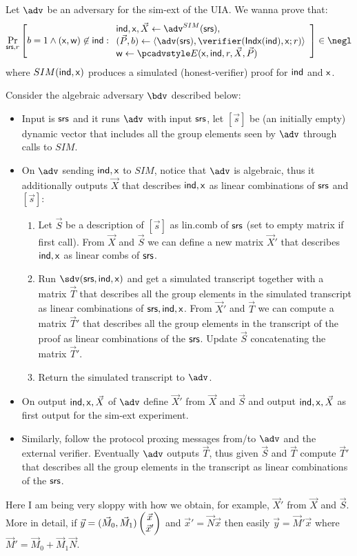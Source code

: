\documentclass[runningheads,11pt]{llncs}
\let\spvec\vec \let\vec\accentvec
\let\vec\spvec
\begin{document}
Let $\adv$ be an adversary for the sim-ext of the UIA.
We wanna prove that:
\[
			\Prob[\srs,r]{
					b=1 \wedge (\inp,\wit)\not\in\ind:
					\begin{array}{l}
						\ind,\inp, \vec X \gets\adv^{SIM}(\srs),\\
					(\vec P,b) \gets \braket{\adv(\srs),\verifier(\Iphp(\ind),\inp;r)}\\
					\wit \gets \Ext(\inp,\ind,r,\vec X,\vec P)
					\end{array}
					}\in\negl
\]
where $SIM( {\mathsf{ind}},\mathsf{x} )$ produces a simulated (honest-verifier) proof for ${\mathsf{ind}}$ and $\mathsf{x}$.

Consider the algebraic adversary $\bdv$ described below:
\begin{itemize}
	\item Input is $\mathsf{srs}$ and it runs $\adv$ with input $\mathsf{srs}$, let $[\vec s]$ be (an
		initially empty)	dynamic vector that includes all the group elements seen by $\adv$ through calls to
		$SIM$.
	\item On $\adv$ sending ${\mathsf{ind}},\mathsf{x}$ to $SIM$, notice that $\adv$ is algebraic, thus it
		additionally outputs $\vec X$ that describes ${\mathsf{ind}},\mathsf{x}$ as linear combinations of
		$\mathsf{srs}$ and $[\vec s]$:
		\begin{enumerate}
			\item Let $\vec S$ be a description of $[\vec s]$ as lin.comb of $\mathsf{srs}$ (set to empty
				matrix if first call).
				From $\vec X$ and $\vec S$ we can define a new matrix $\vec X'$ that describes
				${\mathsf{ind}},\mathsf{x}$ as linear combs of $\mathsf{srs}$.
			\item Run $\sdv(\srs,\ind,\inp)$ and get a simulated transcript together with a matrix $\vec T$
				 that describes all the group elements in the simulated transcript as linear combinations of $\mathsf{srs},{\mathsf{ind}},\mathsf{x}$.
					From $\vec X'$ and $\vec T$ we can compute a matrix $\vec T'$ that describes all
					the group elements in the transcript of the proof as linear combinations of the
					$\mathsf{srs}$. Update $\vec S$ concatenating the matrix $\vec T'$.
			\item Return the simulated transcript to $\adv$.
		\end{enumerate}
	\item On output $\ind,\inp,\vec X$ of $\adv$ define $\vec X'$ from $\vec X$ and $\vec S$
		and output $\ind,\inp,\vec X$ as first output for the sim-ext experiment.
	\item Similarly, follow the protocol proxing messages from/to $\adv$ and the external verifier.
		Eventually $\adv$ outputs $\vec T$, thus given $\vec S$ and $\vec T$ compute $\vec T'$
		that describes all the group elements in the transcript as linear combinations of the
		$\mathsf{srs}$.
\end{itemize}


Here I am being very sloppy with how we obtain, for example, $\vec X'$ from $\vec X$ and
$\vec S$.
More in detail, if 
$\vec y = (\vec M_0, \vec M_1) \pmtrx{\vec x\\\vec x'}$ and $\vec x' = \vec N \vec x$ then
easily $\vec y = \vec M' \vec x$ where $\vec M' = \vec M_0 + \vec M_1\vec N$.
\end{document}
